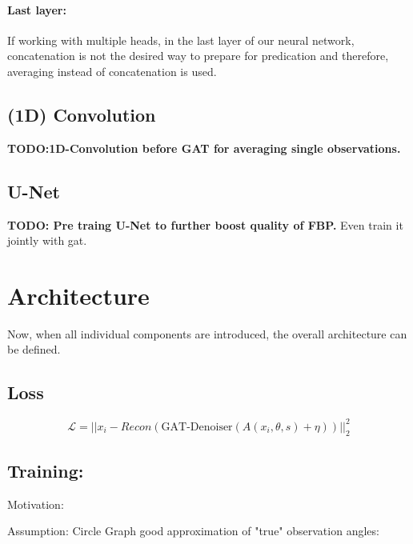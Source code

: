 \paragraph{Last layer:}
If working with multiple heads, in the last layer of our neural network, concatenation is not the desired 
way to prepare for predication and therefore, averaging instead of concatenation is used.


\subsection{(1D) Convolution}
\textbf{TODO:1D-Convolution before GAT for averaging single observations.}


\subsection{U-Net}

\textbf{TODO: Pre traing U-Net to further boost quality of FBP.}
Even train it jointly with gat.


\section{Architecture}
Now, when all individual components are introduced, the overall architecture can be defined.

\subsection{Loss}

\begin{equation}
  \mathcal{L} = || x_i - Recon ( \text{GAT-Denoiser}(A(x_i, \theta, s) + \eta)) ||^2_2
\end{equation}

\subsection{Training:}

Motivation:

Assumption:
Circle Graph good approximation of "true" observation angles:

